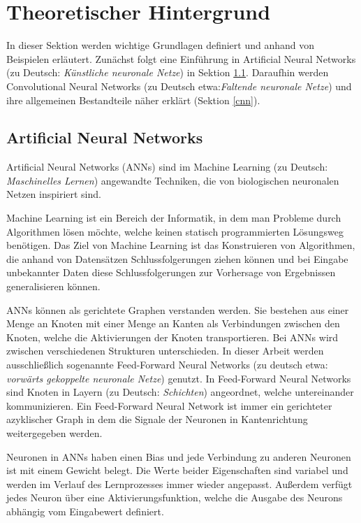 \section{Theoretischer Hintergrund}
\label{th}
In dieser Sektion werden wichtige Grundlagen definiert und anhand von Beispielen erläutert. Zunächst folgt eine Einführung in Artificial Neural Networks (zu Deutsch: \textit{Künstliche neuronale Netze}) in Sektion \ref{ann}. Daraufhin werden Convolutional Neural Networks (zu Deutsch etwa:\textit{Faltende neuronale Netze}) und ihre allgemeinen Bestandteile näher erklärt (Sektion \ref{cnn}). 

\subsection{Artificial Neural Networks}
\label{ann}
Artificial Neural Networks (ANNs) sind im Machine Learning (zu Deutsch: \textit{Maschinelles Lernen}) angewandte Techniken, die von biologischen neuronalen Netzen inspiriert sind.  

Machine Learning ist ein Bereich der Informatik, in dem man Probleme durch Algorithmen lösen möchte, welche keinen statisch programmierten Lösungsweg benötigen. Das Ziel von Machine Learning ist das Konstruieren von Algorithmen, die anhand von Datensätzen Schlussfolgerungen ziehen können und bei Eingabe unbekannter Daten diese Schlussfolgerungen zur Vorhersage von Ergebnissen generalisieren können.

ANNs können als gerichtete Graphen verstanden werden. Sie bestehen aus einer Menge an Knoten mit einer Menge an Kanten als Verbindungen zwischen den Knoten, welche die Aktivierungen der Knoten transportieren. Bei ANNs wird zwischen verschiedenen Strukturen unterschieden. In dieser Arbeit werden ausschließlich sogenannte Feed-Forward Neural Networks (zu deutsch etwa: \textit{vorwärts gekoppelte neuronale Netze}) genutzt. In Feed-Forward Neural Networks sind Knoten in Layern (zu Deutsch: \textit{Schichten}) angeordnet, welche untereinander kommunizieren. Ein Feed-Forward Neural Network ist immer ein gerichteter azyklischer Graph in dem die Signale der Neuronen in Kantenrichtung weitergegeben werden.

Neuronen in ANNs haben einen Bias und jede Verbindung zu anderen Neuronen ist mit einem Gewicht belegt. Die Werte beider Eigenschaften sind variabel und werden im Verlauf des Lernprozesses immer wieder angepasst. Außerdem verfügt jedes Neuron über eine Aktivierungsfunktion, welche die Ausgabe des Neurons abhängig vom Eingabewert definiert.

